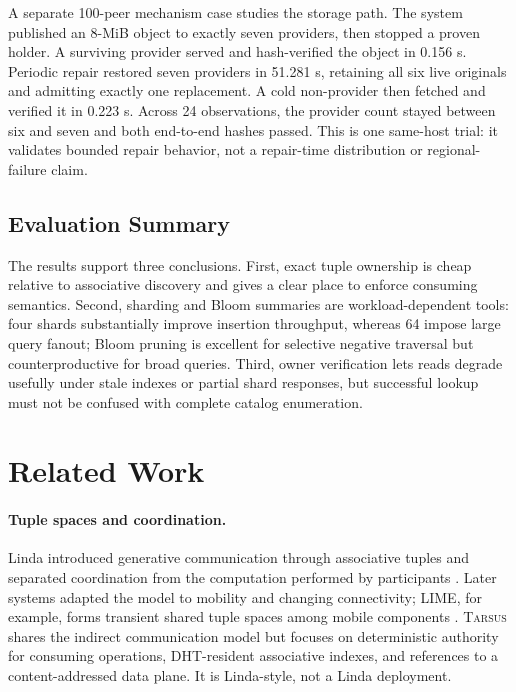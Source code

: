 \documentclass[conference]{IEEEtran}
\newcommand{\system}{\textsc{Tarsus}\xspace}
\begin{document}
A separate 100-peer mechanism case studies the storage path. The system
published an 8-MiB object to exactly seven providers, then stopped a proven
holder. A surviving provider served and hash-verified the object in 0.156 s.
Periodic repair restored seven providers in 51.281 s, retaining all six live
originals and admitting exactly one replacement. A cold non-provider then
fetched and verified it in 0.223 s. Across 24 observations, the provider count
stayed between six and seven and both end-to-end hashes passed. This is one
same-host trial: it validates bounded repair behavior, not a repair-time
distribution or regional-failure claim.

\subsection{Evaluation Summary}

The results support three conclusions. First, exact tuple ownership is cheap
relative to associative discovery and gives a clear place to enforce consuming
semantics. Second, sharding and Bloom summaries are workload-dependent tools:
four shards substantially improve insertion throughput, whereas 64 impose
large query fanout; Bloom pruning is excellent for selective negative
traversal but counterproductive for broad queries. Third, owner verification
lets reads degrade usefully under stale indexes or partial shard responses,
but successful lookup must not be confused with complete catalog enumeration.

\section{Related Work}
\label{sec:related}

\paragraph{Tuple spaces and coordination.}
Linda introduced generative communication through associative tuples and
separated coordination from the computation performed by participants
\cite{Gelernter1985,CarrieroGelernter1989}. Later systems adapted the model to
mobility and changing connectivity; LIME, for example, forms transient shared
tuple spaces among mobile components \cite{MurphyLIME}. \system shares the
indirect communication model but focuses on deterministic authority for
consuming operations, DHT-resident associative indexes, and references to a
content-addressed data plane. It is Linda-style, not a Linda deployment.
\end{document}
